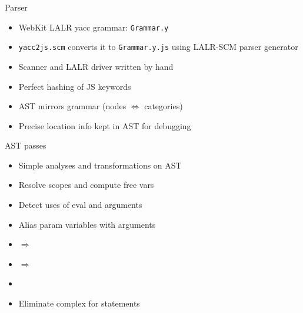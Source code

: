 \begin{frame}{Parser}
    \begin{itemize}
        \item WebKit LALR yacc grammar: \texttt{Grammar.y}
        \item \texttt{yacc2js.scm} converts it to \texttt{Grammar.y.js} using LALR-SCM parser generator
        \item Scanner and LALR driver written by hand
        \item Perfect hashing of JS keywords
        \item AST mirrors grammar (nodes $\Leftrightarrow$ categories)
        \item Precise location info kept in AST for debugging
    \end{itemize}
\end{frame}

\begin{frame}{AST passes}
    \begin{itemize}
        \item Simple analyses and transformations on AST
        \item Resolve scopes and compute free vars
        \item Detect uses of eval and arguments
        \item Alias param variables with arguments
        \item {}  $\Rightarrow$  
        \item {}
        $\Rightarrow$
        \item {}
        \item Eliminate complex for statements
    \end{itemize}
\end{frame}

